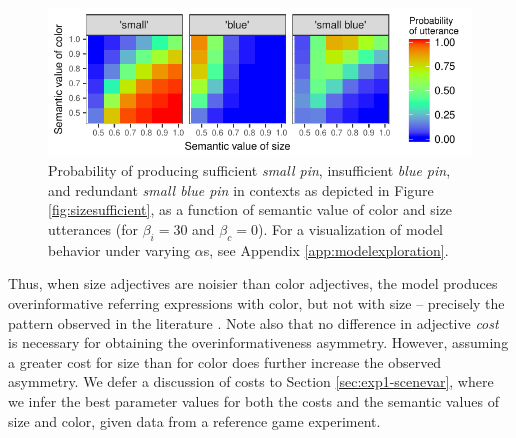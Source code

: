 \documentclass[11pt]{article}
\newcommand{\figref}[1]{Figure \ref{#1}}
\newcommand{\appref}[1]{Appendix \ref{#1}}
\newcommand{\sectionref}[1]{Section \ref{#1}}
\begin{document}
\begin{figure}
\centering
\includegraphics[width=.9\textwidth]{pics/modelexploration-fidelityeffect-paper}

\caption{Probability of producing sufficient \emph{small pin}, insufficient \emph{blue pin}, and redundant \emph{small blue pin} in contexts as depicted in \figref{fig:sizesufficient}, as a function of semantic value of color and size utterances (for $\beta_i = 30$ and $ \beta_c = 0$). For a visualization of model behavior under varying $\alpha$s, see \appref{app:modelexploration}.}
\label{fig:basicasymmetry}
\end{figure}

Thus, when size adjectives are noisier than color adjectives, the model produces overinformative referring expressions with color, but not with size -- precisely the pattern observed in the literature \cite{Pechmann1989, gatt2011}. Note also that no difference in adjective \emph{cost} is necessary for obtaining the overinformativeness asymmetry. However, assuming a greater cost for size than for color does further increase the observed asymmetry. We defer a discussion of costs to \sectionref{sec:exp1-scenevar}, where we infer the best parameter values for both the costs and the semantic values of size and color, given data from a reference game experiment.
\end{document}
